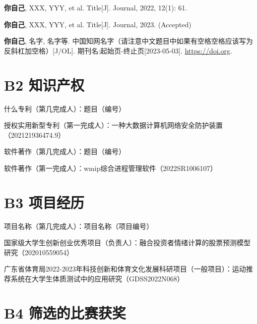 \documentclass[14pt]{jnuthesis}
\begin{document}
\begin{enumerate}[{[}1{]}]
	\item \textbf{你自己}, XXX, YYY, et al. Title[J]. Journal, 2022, 12(1): 61. 
	\item \textbf{你自己}, XXX, YYY, et al. Title[J]. Journal, 2023. (Accepted)
	\item \textbf{你自己}, 名字, 名字等. 中国知网名字（请注意中文题目中如果有空格空格应该写为反斜杠加空格）[J/OL]. 期刊名:起始页-终止页[2023-05-03]. \url{https://doi.org}. %
\end{enumerate}

\section*{B2 知识产权}

\begin{enumerate}[{[}1{]}]
	\item 什么专利（第几完成人）：题目（编号）
	\item 授权实用新型专利（第一完成人）：一种大数据计算机网络安全防护装置（202121936474.9）
	\item 软件著作（第几完成人）：题目（编号）
	\item 软件著作（第一完成人）：wmip综合进程管理软件（2022SR1006107）
\end{enumerate}

\section*{B3 项目经历}

\begin{enumerate}[{[}1{]}]
	\item 项目名称（第几完成人）：项目名称（项目编号） %
	\item 国家级大学生创新创业优秀项目（负责人）：融合投资者情绪计算的股票预测模型研究（202010559054）
	\item 广东省体育局2022-2023年科技创新和体育文化发展科研项目（一般项目）：运动推荐系统在大学生体质测试中的应用研究（GDSS2022N068）
\end{enumerate}

\section*{B4 筛选的比赛获奖}
\end{document}
